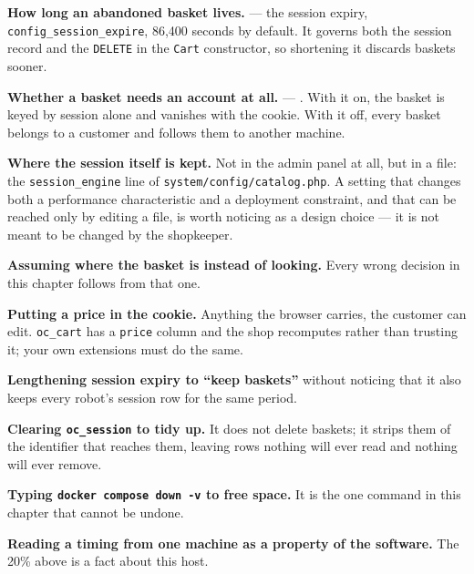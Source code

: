 \begin{examplebox}
\begin{tight}
  \item \textbf{How long an abandoned basket lives.}
         --- the session expiry,
        \texttt{config\_session\_expire}, 86{,}400 seconds by default. It
        governs both the session record and the \texttt{DELETE} in the
        \texttt{Cart} constructor, so shortening it discards baskets sooner.
  \item \textbf{Whether a basket needs an account at all.}
         --- .
        With it on, the basket is keyed by session alone and vanishes with the
        cookie. With it off, every basket belongs to a customer and follows
        them to another machine.
  \item \textbf{Where the session itself is kept.} Not in the admin panel at
        all, but in a file: the \texttt{session\_engine} line of
        \texttt{system/config/catalog.php}. A setting that changes both a
        performance characteristic and a deployment constraint, and that can
        be reached only by editing a file, is worth noticing as a design
        choice --- it is not meant to be changed by the shopkeeper.
\end{tight}
\end{examplebox}

\begin{pitfall}
\begin{tight}
  \item \textbf{Assuming where the basket is instead of looking.} Every wrong
        decision in this chapter follows from that one.
  \item \textbf{Putting a price in the cookie.} Anything the browser carries,
        the customer can edit. \texttt{oc\_cart} has a \texttt{price} column
        and the shop recomputes rather than trusting it; your own extensions
        must do the same.
  \item \textbf{Lengthening session expiry to ``keep baskets''} without
        noticing that it also keeps every robot's session row for the same
        period.
  \item \textbf{Clearing \texttt{oc\_session} to tidy up.} It does not delete
        baskets; it strips them of the identifier that reaches them, leaving
        rows nothing will ever read and nothing will ever remove.
  \item \textbf{Typing \texttt{docker compose down -v} to free space.} It is
        the one command in this chapter that cannot be undone.
  \item \textbf{Reading a timing from one machine as a property of the
        software.} The 20\% above is a fact about this host.
\end{tight}
\end{pitfall}

